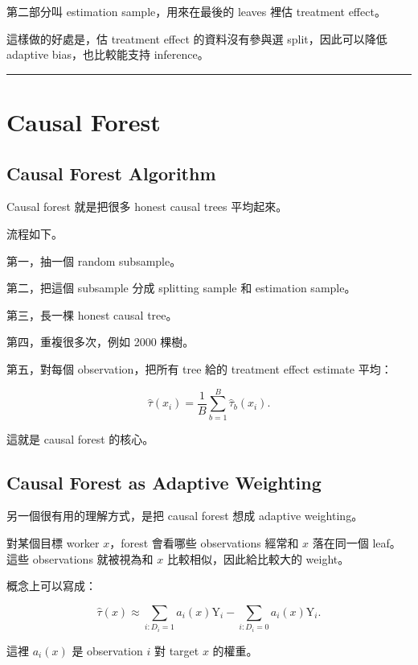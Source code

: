 \documentclass[
  chinese,
  11pt,
]{article}
\begin{document}
第二部分叫 estimation sample，用來在最後的 leaves 裡估 treatment
effect。

這樣做的好處是，估 treatment effect 的資料沒有參與選 split，因此可以降低
adaptive bias，也比較能支持 inference。

\begin{center}\rule{0.5\linewidth}{0.5pt}\end{center}

\section{Causal Forest}\label{causal-forest}

\subsection{Causal Forest Algorithm}\label{causal-forest-algorithm}

Causal forest 就是把很多 honest causal trees 平均起來。

流程如下。

第一，抽一個 random subsample。

第二，把這個 subsample 分成 splitting sample 和 estimation sample。

第三，長一棵 honest causal tree。

第四，重複很多次，例如 2000 棵樹。

第五，對每個 observation，把所有 tree 給的 treatment effect estimate
平均：

\[
\hat{\tau}(x_i)=\frac{1}{B}\sum_{b=1}^B \hat{\tau}_b(x_i).
\]

這就是 causal forest 的核心。

\subsection{Causal Forest as Adaptive
Weighting}\label{causal-forest-as-adaptive-weighting}

另一個很有用的理解方式，是把 causal forest 想成 adaptive weighting。

對某個目標 worker \(x\)，forest 會看哪些 observations 經常和 \(x\)
落在同一個 leaf。這些 observations 就被視為和 \(x\)
比較相似，因此給比較大的 weight。

概念上可以寫成：

\[
\hat{\tau}(x)
\approx
\sum_{i:D_i=1} a_i(x)\mathrm{Y}_i
-
\sum_{i:D_i=0} a_i(x)\mathrm{Y}_i.
\]

這裡 \(a_i(x)\) 是 observation \(i\) 對 target \(x\) 的權重。
\end{document}
